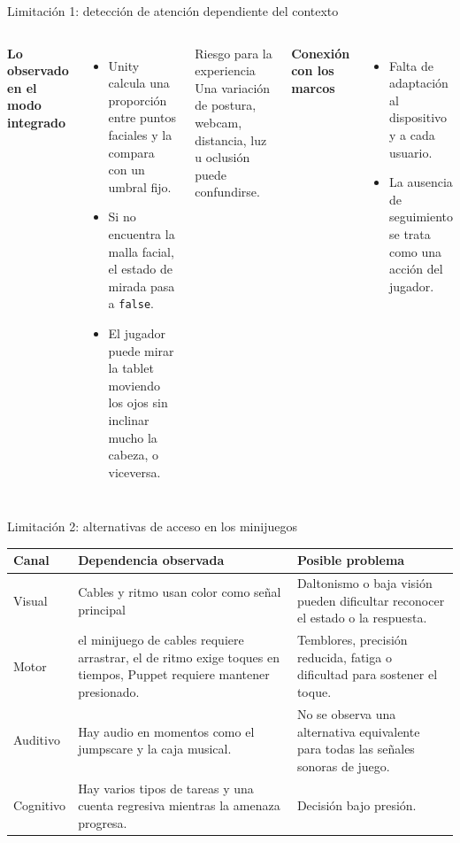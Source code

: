 \documentclass[aspectratio=169,11pt]{beamer}
\newcommand{\tagline}[1]{{\color{Teal}\bfseries\small #1}}
\begin{document}
\begin{frame}{Limitación 1: detección de atención dependiente del contexto}
  \begin{columns}[T,onlytextwidth]
      \tagline{Lo observado en el modo integrado}
      \begin{itemize}
        \item Unity calcula una proporción entre puntos faciales y la compara con un umbral fijo.
        \item Si no encuentra la malla facial, el estado de mirada pasa a \texttt{false}.
        \item El jugador puede mirar la tablet moviendo los ojos sin inclinar mucho la cabeza, o viceversa.
      \end{itemize}
      \begin{block}{Riesgo para la experiencia}
        Una variación de postura, webcam, distancia, luz u oclusión puede confundirse.
      \end{block}
      \tagline{Conexión con los marcos}
      \begin{itemize}
        \item [1] Falta de adaptación al dispositivo y a cada usuario.
        \item [2] La ausencia de seguimiento se trata como una acción del jugador.
      \end{itemize}
  \end{columns}
\end{frame}

\begin{frame}{Limitación 2: alternativas de acceso en los minijuegos}
  \small
  \begin{tabular}{>{\RaggedRight\arraybackslash}p{.15\linewidth} >{\RaggedRight\arraybackslash}p{.35\linewidth} >{\RaggedRight\arraybackslash}p{.38\linewidth}}
    \toprule
    \textbf{Canal}
    & \textbf{Dependencia observada} & \textbf{Posible problema} \\
    \midrule
    Visual & Cables y ritmo usan color como señal principal & Daltonismo o baja visión pueden dificultar reconocer el estado o la respuesta.\\[.35em]
    Motor& el minijuego de cables requiere arrastrar, el de ritmo exige toques en tiempos, Puppet requiere mantener presionado. & Temblores, precisión reducida, fatiga o dificultad para sostener el toque.\\[.35em]
    Auditivo 
    & Hay audio en momentos como el jumpscare y la caja musical. & No se observa una alternativa equivalente para todas las señales sonoras de juego.\\[.35em]
    Cognitivo
    & Hay varios tipos de tareas y una cuenta regresiva mientras la amenaza progresa. & Decisión bajo presión.\\
    \bottomrule
  \end{tabular}
\end{frame}
\end{document}
